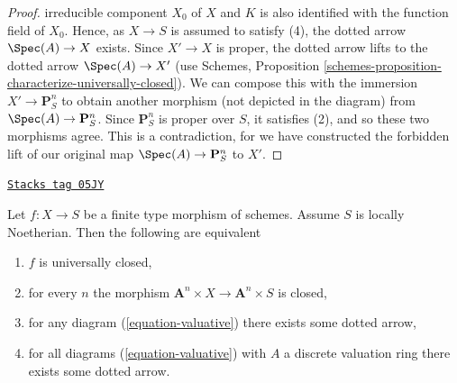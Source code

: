 \begin{proof}
irreducible component $X_0$ of $X$ and $K$ is also identified with
the function field of $X_0$. Hence, as $X \to S$ is assumed to satisfy (4),
the dotted arrow $\Spec(A) \to X$ exists.
Since $X' \to X$ is proper, the dotted
arrow lifts to the dotted arrow $\Spec(A) \to X'$ (use Schemes,
Proposition \ref{schemes-proposition-characterize-universally-closed}).
We can compose this with the immersion $X' \to \mathbf{P}^n_S$ to obtain
another morphism (not depicted in the diagram) from
$\Spec(A) \to \mathbf{P}^n_S$.  Since $\mathbf{P}^n_S$
is proper over $S$, it satisfies (2), and so these two morphisms
agree.  This is a contradiction, for we have constructed the
forbidden lift of our original map $\Spec(A) \to \mathbf{P}^n_S$
to $X'$.
\end{proof}

\begin{lemma}
\label{limits-lemma-check-universally-closed-Noetherian}
\href{https://stacks.math.columbia.edu/tag/05JY}{\texttt{Stacks tag 05JY}}

Let $f : X \to S$ be a finite type morphism of schemes.
Assume $S$ is locally Noetherian. Then the following are equivalent
\begin{enumerate}
\item $f$ is universally closed,
\item for every $n$ the morphism
$\mathbf{A}^n \times X \to \mathbf{A}^n \times S$ is closed,
\item for any diagram (\ref{equation-valuative}) there exists some
dotted arrow,
\item for all diagrams (\ref{equation-valuative}) with $A$ a discrete
valuation ring there exists some dotted arrow.
\end{enumerate}
\end{lemma}

